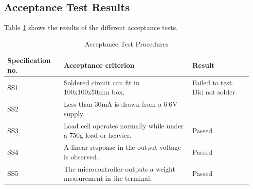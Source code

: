 \documentclass[class=report,11pt,crop=false]{standalone}
\begin{document}
	\subsection{Acceptance Test Results}
	Table \ref{tab:S7} shows the results of the different acceptance tests.
	\begin{longtable}[c]{|p{}|p{}|p{}|}
		\caption{Acceptance Test Procedures}
		\label{tab:S7}\\
		\hline
		\textbf{Specification   no.} & \textbf{Acceptance   criterion}                                                                                                                                                            & Result                                                                                                                      \\ \hline
		\endfirsthead
		\endhead
		SS1                          & Soldered   circuit can fit in 100x100x50mm box.                                                                                                                                            & Failed to   test. Did not solder                                                                                            \\ \hline
		SS2                          & Less than   30mA is drawn from a 6.6V supply.                                                                                                                                              &                                                                                                                             \\ \hline
		SS3                          & Load cell   operates normally while under a 750g load or heavier.                                                                                                                          & Passed                                                                                                                      \\ \hline
		SS4                          & A linear   response in the output voltage is observed.                                                                                                                                     & Passed                                                                                                                      \\ \hline
		SS5                          & The   microcontroller outputs a weight measurement in the terminal.                                                                                                                        & Passed                                                                                                                      \\ \hline

\end{longtable}
\end{document}
